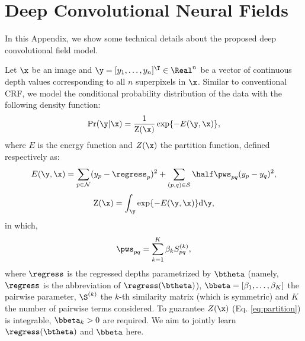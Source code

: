 








\section{Deep Convolutional Neural Fields}


In this Appendix, we show some technical details about the proposed deep convolutional field model.





Let $\x$ be an image and $\y=[y_1,\ldots, y_n]^{\T} \in \Real^n$ be
a vector of continuous depth values corresponding to
 all $n$ superpixels in $\x$.
 Similar to conventional CRF,
 we model the conditional probability distribution of the data with the following density function:
\begin{equation}\label{eq:prob}
\begin{aligned}
\Pr(\y|\x) = \frac{1}{\mathrm{Z}(\x)} \exp \{ -E(\y, \x) \},
\end{aligned}
\end{equation}
where $E$ is the energy function and $Z(\x)$ the partition function, defined respectively as:
\begin{equation}\label{eq:feature}
E(\y, \x) = \sum_{p \in {\cal N} } (y_p - \regress_p)^2
+ \sum_{(p,q) \in {\cal S}} \half \pws_{pq} (y_p - y_q)^2,
\end{equation}
\begin{equation}\label{eq:partition}
\mathrm{Z}(\x) = \int_{\y} \exp \{ -E(\y, \x) \}\mathrm{d}\y,
\end{equation}
in which,
\begin{equation} \label{eq:def_R}
\pws_{pq} = \sum_{k=1}^K \beta_k S_{pq}^{(k)},
\end{equation}
where $\regress$ is the regressed depths parametrized by $\btheta$ (namely, $\regress$ is the abbreviation of $\regress(\btheta)$), $\bbeta=[\beta_1, \ldots, \beta_K]$ the pairwise parameter, $\S^{(k)}$ the $k$-th similarity matrix (which is symmetric) and $K$ the number of pairwise terms considered.
To guarantee $Z(\x)$ (Eq. \eqref{eq:partition}) is integrable, $\bbeta_k > 0$ are required.
We aim to jointly learn $\regress(\btheta)$ and $\bbeta$ here.



